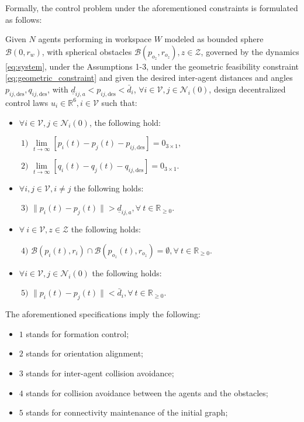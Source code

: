 Formally, the control problem under the aforementioned constraints is
formulated as follows:

\begin{problem} \label{problem}
	Given $N$ agents performing in workspace $W$ modeled as bounded sphere
  $\mathcal{B}(0,r_w)$, with spherical obstacles
  $\mathcal{B}(p_{o_z}, r_{o_z}), z \in \mathcal{Z}$, governed by the dynamics
  \eqref{eq:system}, under the Assumptions 1-3, under the geometric feasibility
  constraint \eqref{eq:geometric_constraint} and given the desired inter-agent
  distances and angles $p_{ij, \text{des}}, q_{ij, \text{des}}$, with
  $\underline{d}_{ij, a} < p_{ij, \text{des}} < \bar{d}_{i}$, $\forall i \in \mathcal{V}, j \in \mathcal{N}_i(0)$,
  design decentralized control laws $u_i \in\mathbb{R}^6,i\in\mathcal{V}$
  such that:

	\begin{itemize}
		\item $\forall i \in \mathcal{V}, j \in \mathcal{N}_i(0)$,
      the following hold:

		$\ 1)$ $\lim\limits_{t \to \infty} \left[ p_{i}(t)-p_{j}(t) - p_{ij, \text{des}} \right] = 0_{3\times1}$,

		$\ 2)$ $\lim\limits_{t \to \infty} \left[q_{i}(t) - q_{j}(t) - q_{ij, \text{des}}\right] = 0_{3\times1}$.

		\item \noindent $\forall i,j \in \mathcal{V}, i \neq j$ the following holds:

		$\ 3)$ $\|p_i(t)-p_j(t)\| > \underline{d}_{ij, a}, \forall \ t \in \mathbb{R}_{\geq 0}$.
		\item $\forall \ i \in \mathcal{V}, z \in \mathcal{Z}$ the following holds:

		$\ 4)$ $\mathcal{B}(p_i(t), r_i) \cap \mathcal{B}(p_{o_z}(t), r_{o_z}) = \emptyset, \forall \ t \in \mathbb{R}_{\geq 0}$.

		\item $\forall i \in \mathcal{V}, j \in \mathcal{N}_i(0)$ the following holds:

		$\ 5)$ $\|p_i(t)-p_j(t)\| < \bar{d}_{i}, \forall \ t \in \mathbb{R}_{\geq 0}$.
	\end{itemize}

\end{problem}

\noindent The aforementioned specifications imply the following:
\begin{itemize}
	\item $1$ stands for formation control;
	\item $2$ stands for orientation alignment;
	\item $3$ stands for inter-agent collision avoidance;
	\item $4$ stands for collision avoidance between the agents and the obstacles;
	\item $5$ stands for connectivity maintenance of the initial graph;
\end{itemize}
